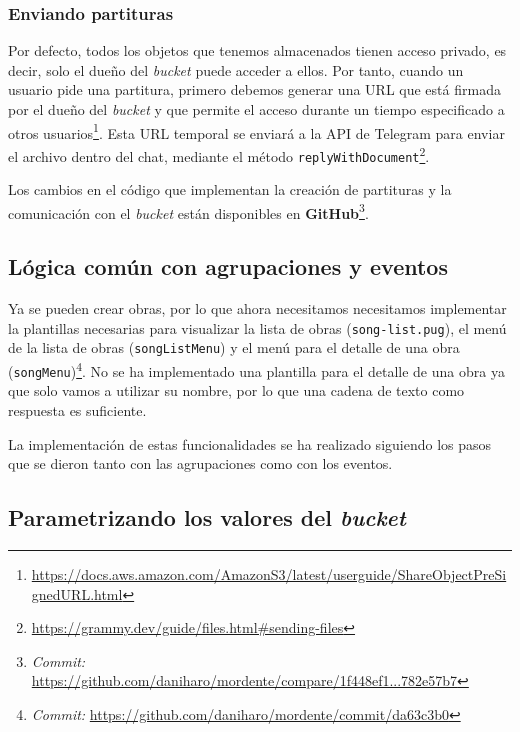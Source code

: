 \subsubsection{Enviando partituras}

Por defecto, todos los objetos que tenemos almacenados tienen acceso privado, es decir, solo el dueño del \textit{bucket} puede acceder a ellos. Por tanto, cuando un usuario pide una partitura, primero debemos generar una URL que está firmada por el dueño del \textit{bucket} y que permite el acceso durante un tiempo especificado a otros usuarios\footnote{\url{https://docs.aws.amazon.com/AmazonS3/latest/userguide/ShareObjectPreSignedURL.html}}. Esta URL temporal se enviará a la API de Telegram para enviar el archivo dentro del chat, mediante el método \texttt{replyWithDocument}\footnote{\url{https://grammy.dev/guide/files.html\#sending-files}}.

Los cambios en el código que implementan la creación de partituras y la comunicación con el \textit{bucket} están disponibles en \textbf{GitHub}\footnote{\textit{Commit:} \url{https://github.com/daniharo/mordente/compare/1f448ef1...782e57b7}}.

\subsection{Lógica común con agrupaciones y eventos}

Ya se pueden crear obras, por lo que ahora necesitamos necesitamos implementar la plantillas necesarias para visualizar la lista de obras (\texttt{song-list.pug}), el menú de la lista de obras (\texttt{songListMenu}) y el menú para el detalle de una obra (\texttt{songMenu})\footnote{\textit{Commit:} \url{https://github.com/daniharo/mordente/commit/da63c3b0}}. No se ha implementado una plantilla para el detalle de una obra ya que solo vamos a utilizar su nombre, por lo que una cadena de texto como respuesta es suficiente.

La implementación de estas funcionalidades se ha realizado siguiendo los pasos que se dieron tanto con las agrupaciones como con los eventos.

\subsection{Parametrizando los valores del \textit{bucket}}


